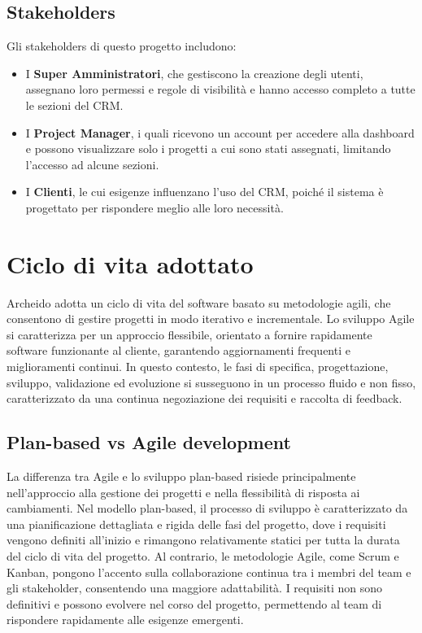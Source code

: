 \documentclass[target=bach,aauheader=,style=]{thud}
\begin{document}
\subsection{Stakeholders}
Gli stakeholders di questo progetto includono:

\begin{itemize}
    \item I \textbf{Super Amministratori}, che gestiscono la creazione degli utenti, assegnano loro permessi e regole di visibilità e hanno accesso completo a tutte le sezioni del CRM. 
    \item I \textbf{Project Manager}, i quali ricevono un account per accedere alla dashboard e possono visualizzare solo i progetti a cui sono stati assegnati, limitando l'accesso ad alcune sezioni.
    \item I \textbf{Clienti}, le cui esigenze influenzano l'uso del CRM, poiché il sistema è progettato per rispondere meglio alle loro necessità.
\end{itemize}

\section{Ciclo di vita adottato}
Archeido adotta un ciclo di vita del software basato su metodologie agili, che consentono di gestire progetti in modo iterativo e incrementale. Lo sviluppo Agile si caratterizza per un approccio flessibile, orientato a fornire rapidamente software funzionante al cliente, garantendo aggiornamenti frequenti e miglioramenti continui. In questo contesto, le fasi di specifica, progettazione, sviluppo, validazione ed evoluzione si susseguono in un processo fluido e non fisso, caratterizzato da una continua negoziazione dei requisiti e raccolta di feedback.

\subsection{Plan-based vs Agile development}
La differenza tra Agile e lo sviluppo plan-based risiede principalmente nell'approccio alla gestione dei progetti e nella flessibilità di risposta ai cambiamenti. Nel modello plan-based, il processo di sviluppo è caratterizzato da una pianificazione dettagliata e rigida delle fasi del progetto, dove i requisiti vengono definiti all'inizio e rimangono relativamente statici per tutta la durata del ciclo di vita del progetto. Al contrario, le metodologie Agile, come Scrum e Kanban, pongono l'accento sulla collaborazione continua tra i membri del team e gli stakeholder, consentendo una maggiore adattabilità. I requisiti non sono definitivi e possono evolvere nel corso del progetto, permettendo al team di rispondere rapidamente alle esigenze emergenti.
\end{document}
